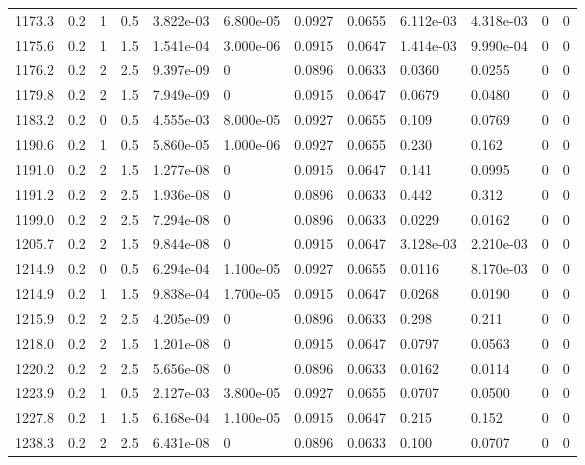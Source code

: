 \documentclass[preview]{standalone}
\begin{document}
{{{{{{{\begin{tabular}{L{1.2cm}C{1.2cm} C{0.3cm}C{0.5cm} C{1.4cm}C{1.4cm} C{1.4cm}C{1.4cm} C{1.6cm}C{1.6cm} C{1.6cm}C{1.6cm}}
  1173.3  &   0.2  & 1     & 0.5 &  3.822e-03  & 6.800e-05  &  0.0927&   0.0655& 6.112e-03 & 4.318e-03   &  0 & 0  \\ 
  1175.6  &   0.2  & 1     & 1.5 &  1.541e-04  & 3.000e-06  &  0.0915&   0.0647& 1.414e-03 & 9.990e-04   &  0 & 0  \\ 
  1176.2  &   0.2  & 2     & 2.5 &  9.397e-09  & 0  &  0.0896&   0.0633& 0.0360 & 0.0255   &  0 & 0  \\ 
  1179.8  &   0.2  & 2     & 1.5 &  7.949e-09  & 0  &  0.0915&   0.0647& 0.0679 & 0.0480   &  0 & 0  \\ 
  1183.2  &   0.2  & 0     & 0.5 &  4.555e-03  & 8.000e-05  &  0.0927&   0.0655& 0.109 & 0.0769   &  0 & 0  \\ 
  1190.6  &   0.2  & 1     & 0.5 &  5.860e-05  & 1.000e-06  &  0.0927&   0.0655& 0.230 & 0.162   &  0 & 0  \\ 
  1191.0  &   0.2  & 2     & 1.5 &  1.277e-08  & 0  &  0.0915&   0.0647& 0.141 & 0.0995   &  0 & 0  \\ 
  1191.2  &   0.2  & 2     & 2.5 &  1.936e-08  & 0  &  0.0896&   0.0633& 0.442 & 0.312   &  0 & 0  \\ 
  1199.0  &   0.2  & 2     & 2.5 &  7.294e-08  & 0  &  0.0896&   0.0633& 0.0229 & 0.0162   &  0 & 0  \\ 
  1205.7  &   0.2  & 2     & 1.5 &  9.844e-08  & 0  &  0.0915&   0.0647& 3.128e-03 & 2.210e-03   &  0 & 0  \\ 
  1214.9  &   0.2  & 0     & 0.5 &  6.294e-04  & 1.100e-05  &  0.0927&   0.0655& 0.0116 & 8.170e-03   &  0 & 0  \\ 
  1214.9  &   0.2  & 1     & 1.5 &  9.838e-04  & 1.700e-05  &  0.0915&   0.0647& 0.0268 & 0.0190   &  0 & 0  \\ 
  1215.9  &   0.2  & 2     & 2.5 &  4.205e-09  & 0  &  0.0896&   0.0633& 0.298 & 0.211   &  0 & 0  \\ 
  1218.0  &   0.2  & 2     & 1.5 &  1.201e-08  & 0  &  0.0915&   0.0647& 0.0797 & 0.0563   &  0 & 0  \\ 
  1220.2  &   0.2  & 2     & 2.5 &  5.656e-08  & 0  &  0.0896&   0.0633& 0.0162 & 0.0114   &  0 & 0  \\ 
  1223.9  &   0.2  & 1     & 0.5 &  2.127e-03  & 3.800e-05  &  0.0927&   0.0655& 0.0707 & 0.0500   &  0 & 0  \\ 
  1227.8  &   0.2  & 1     & 1.5 &  6.168e-04  & 1.100e-05  &  0.0915&   0.0647& 0.215 & 0.152   &  0 & 0  \\ 
  1238.3  &   0.2  & 2     & 2.5 &  6.431e-08  & 0  &  0.0896&   0.0633& 0.100 & 0.0707   &  0 & 0  \\ 

\end{tabular}}}}}}}}
\end{document}
